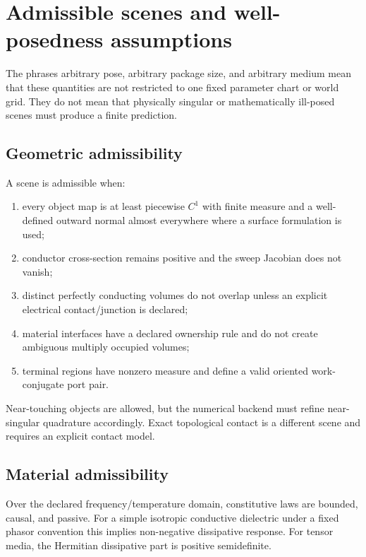 \section{Admissible scenes and well-posedness assumptions}
\label{sec:admissible-scenes}

The phrases arbitrary pose, arbitrary package size, and arbitrary medium mean
that these quantities are not restricted to one fixed parameter chart or world
grid. They do not mean that physically singular or mathematically ill-posed
scenes must produce a finite prediction.

\subsection{Geometric admissibility}

A scene is admissible when:
\begin{enumerate}
\item every object map is at least piecewise $C^1$ with finite measure and a
      well-defined outward normal almost everywhere where a surface formulation
      is used;
\item conductor cross-section remains positive and the sweep Jacobian does not
      vanish;
\item distinct perfectly conducting volumes do not overlap unless an explicit
      electrical contact/junction is declared;
\item material interfaces have a declared ownership rule and do not create
      ambiguous multiply occupied volumes;
\item terminal regions have nonzero measure and define a valid oriented
      work-conjugate port pair.
\end{enumerate}

Near-touching objects are allowed, but the numerical backend must refine
near-singular quadrature accordingly. Exact topological contact is a different
scene and requires an explicit contact model.

\subsection{Material admissibility}

Over the declared frequency/temperature domain, constitutive laws are bounded,
causal, and passive. For a simple isotropic conductive dielectric under a fixed
phasor convention this implies non-negative dissipative response. For tensor
media, the Hermitian dissipative part is positive semidefinite.

